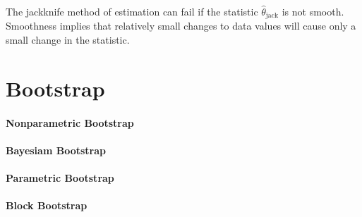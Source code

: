 The jackknife method of estimation can fail if the statistic $\hat{\theta}_{\text{jack}}$ is not smooth. Smoothness
implies that relatively small changes to data values will cause only a small change in the
statistic.

\begin{example}

\end{example}

\begin{example}

\end{example}

\section{Bootstrap}

\paragraph{Nonparametric Bootstrap}

\paragraph{Bayesiam Bootstrap}


\paragraph{Parametric Bootstrap}

\paragraph{Block Bootstrap}
